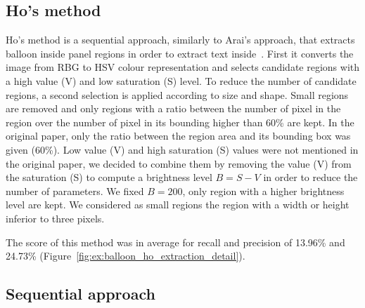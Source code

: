 
\subsection{Ho's method~\cite{Ho2012}} %

Ho's method is a sequential approach, similarly to Arai's approach, that extracts balloon inside panel regions in order to extract text inside~\cite{Ho2012}.
First it converts the image from RBG to HSV colour representation and selects candidate regions with a high value (V) and low saturation (S) level.
To reduce the number of candidate regions, a second selection is applied according to size and shape.
Small regions are removed and only regions with a ratio between the number of pixel in the region over the number of pixel in its bounding higher than 60\% are kept.
In the original paper, only the ratio between the region area and its bounding box was given (60\%).
Low value (V) and high saturation (S) values were not mentioned in the original paper, we decided to combine them by removing the value (V) from the saturation (S) to compute a brightness level $B=S-V$ in order to reduce the number of parameters.
We fixed $B=200$, only region with a higher brightness level are kept.
We considered as small regions the region with a width or height inferior to three pixels.

The score of this method was in average for recall and precision of 13.96\% and 24.73\% (Figure~\ref{fig:ex:balloon_ho_extraction_detail}).




\subsection{Sequential approach} %

